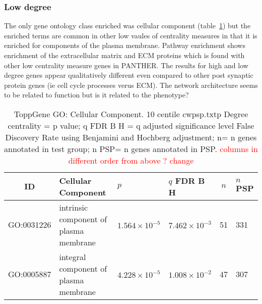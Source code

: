 \subsubsection{Low degree}
The only gene ontology class enriched was cellular component (table~\ref{tab:ToppGENE GO: Cellular Component. 10 centile cwpsp.txtp = p value; q FDR B H = q adjusted significance level False Discovery Rate using Benjamini and Hochberg adjustment; n= n genes annotated in test group; n PSP= n genes annotated in PSP}) but the enriched terms are common in other low vaules of centrality measures in that it is enriched for components of the plasma membrane. Pathway enrichment shows enrichment of the extracellular matrix and ECM proteins which is found with other low centrality measure genes in PANTHER. The results for high and low degree genes appear qualitatively different even compared to other post synaptic protein genes (ie cell cycle processes verus ECM). The network architecture seems to be related to function but is it related to the phenotype?



\begin{table}[ht]
\centering

\begin{adjustbox}{width=\textwidth}
\setlength{\extrarowheight}{2pt}
\begin{tabular}{@{}clllcl@{}}
  \toprule
  ID & Cellular Component &$p$ & $q$ FDR B H  & $n$ & $n$ PSP  \\ 
  \midrule
GO:0031226 & intrinsic component of plasma membrane & $1.564 \times 10^{-5}$ & $7.462 \times 10^{-3}$ & 51 & 331 \\ 
  GO:0005887 & integral component of plasma membrane & $4.228 \times 10^{-5}$ & $1.008 \times 10^{-2}$ & 47 & 307 \\ 
   \bottomrule
\end{tabular}
\end{adjustbox}
\caption{ToppGene GO: Cellular Component. 10 centile cwpsp.txtp Degree centrality = p value; q FDR B H = q adjusted significance level False Discovery Rate using Benjamini and Hochberg adjustment; n= n genes annotated in test group; n PSP= n genes annotated in PSP. \textcolor{red}{columns in different order from above ? change}} 
\label{tab:ToppGENE GO: Cellular Component. 10 centile cwpsp.txtp = p value; q FDR B H = q adjusted significance level False Discovery Rate using Benjamini and Hochberg adjustment; n= n genes annotated in test group; n PSP= n genes annotated in PSP}
\end{table}


